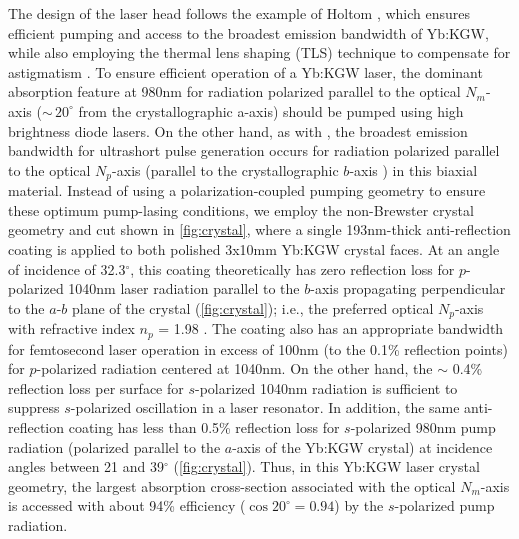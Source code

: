 The design of the laser head follows the example of Holtom \cite{Holtom_mode_locked_2006}, which ensures efficient pumping and access to the broadest emission bandwidth of Yb:KGW, while also employing the thermal lens shaping (TLS) technique to compensate for astigmatism \cite{Rimington_thermal_lens_2004}.
To ensure efficient operation of a Yb:KGW laser, the dominant absorption feature at 980nm for radiation polarized parallel to the optical $N_m$-axis ($\sim\,20^\circ$ from the crystallographic a-axis) should be pumped using high brightness diode lasers.
On the other hand, as with  \cite{Liu_diode_pumped_2001,Killi_high_peak_2005}, the broadest emission bandwidth for ultrashort pulse generation occurs for radiation polarized parallel to the optical $N_p$-axis (parallel to the crystallographic $b$-axis \cite{Holtom_mode_locked_2006}) in this biaxial material. 
Instead of using a polarization-coupled pumping geometry \cite{Holtom_mode_locked_2006} to ensure these optimum pump-lasing conditions, we employ the non-Brewster crystal geometry and cut shown in \ref{fig:crystal}, where a single 193nm-thick  anti-reflection coating is applied to both polished 3x10mm Yb:KGW crystal faces.
At an angle of incidence of 32.3$^\circ$, this coating theoretically has zero reflection loss for $p$-polarized 1040nm laser radiation parallel to the $b$-axis propagating perpendicular to the $a$-$b$ plane of the crystal (\ref{fig:crystal}); i.e., the preferred optical $N_p$-axis with refractive index $n_p$ = 1.98 \cite{Biswal_thermo_optical_05,pujol_crystalline_1999}.
The  coating also has an appropriate bandwidth for femtosecond laser operation in excess of 100nm (to the
0.1\% reflection points) for $p$-polarized radiation centered at 1040nm.
On the other hand, the $\sim$ 0.4\% reflection loss per surface for $s$-polarized 1040nm radiation is sufficient to suppress $s$-polarized oscillation in a laser resonator.
In addition, the same anti-reflection coating has less than 0.5\% reflection loss for $s$-polarized 980nm pump radiation (polarized parallel to the $a$-axis of the Yb:KGW crystal) at incidence angles between 21 and 39$^\circ$ (\ref{fig:crystal}).
Thus, in this Yb:KGW laser crystal geometry, the largest absorption cross-section associated with the optical $N_m$-axis is accessed with about 94\% efficiency ($\cos 20^\circ = 0.94$) by the $s$-polarized pump radiation.

